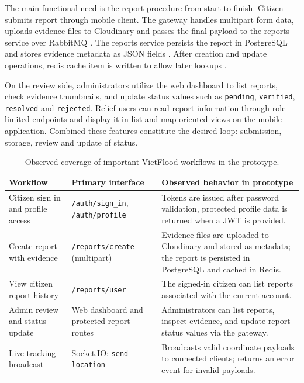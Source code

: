 The main functional need is the report procedure from start to finish. Citizen submits report through mobile client. The gateway handles multipart form data, uploads evidence files to Cloudinary \cite{cloudinaryUploadDocs} and passes the final payload to the reports service over RabbitMQ \cite{rabbitmqConfirmsDocs}. The reports service persists the report in PostgreSQL and stores evidence metadata as JSON fields \cite{postgresqlJsonDocs}.  After creation and update operations, redis cache item is written to allow later lookups \cite{redisDocs}.

On the review side, administrators utilize the web dashboard to list reports, check evidence thumbnails, and update status values such as \texttt{pending}, \texttt{verified}, \texttt{resolved} and \texttt{rejected}. Relief users can read report information through role limited endpoints and display it in list and map oriented views on the mobile application. Combined these features constitute the desired loop: submission, storage, review and update of status.

\begin{table}[H]
\centering
\caption{Observed coverage of important VietFlood workflows in the prototype.}
\label{tab:vietflood-functional-evaluation}
\scriptsize
\setlength{\tabcolsep}{5pt}
\renewcommand{\arraystretch}{1.25}
\begin{tabularx}{\textwidth}{|p{3.2cm}|p{4.1cm}|X|}
\hline
\textbf{Workflow} & \textbf{Primary interface} & \textbf{Observed behavior in prototype} \\
\hline
Citizen sign in and profile access & \texttt{/auth/sign\_in}, \texttt{/auth/profile} & Tokens are issued after password validation, protected profile data is returned when a JWT is provided. \\
\hline
Create report with evidence & \texttt{/reports/create} (multipart) & Evidence files are uploaded to Cloudinary and stored as metadata; the report is persisted in PostgreSQL and cached in Redis. \\
\hline
View citizen report history & \texttt{/reports/user} & The signed-in citizen can list reports associated with the current account. \\
\hline
Admin review and status update & Web dashboard and protected report routes & Administrators can list reports, inspect evidence, and update report status values via the gateway. \\
\hline
Live tracking broadcast & Socket.IO: \texttt{send-location} & Broadcasts valid coordinate payloads to connected clients; returns an error event for invalid payloads. \\
\hline
\end{tabularx}
\end{table}

